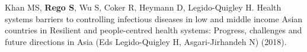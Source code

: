 \begin{cventries}
{\begin{cvitems}
        \vspace{1ex}
        \item {Khan MS, \textbf{Rego S}, Wu S, Coker R, Heymann D, Legido-Quigley H. Health systems barriers to controlling infectious diseases in low and middle income Asian countries in Resilient and people-centred health systems: Progress, challenges and future directions in Asia (Eds Legido-Quigley H, Asgari-Jirhandeh N) (2018).}
     \end{cvitems}
      }


\end{cventries}

